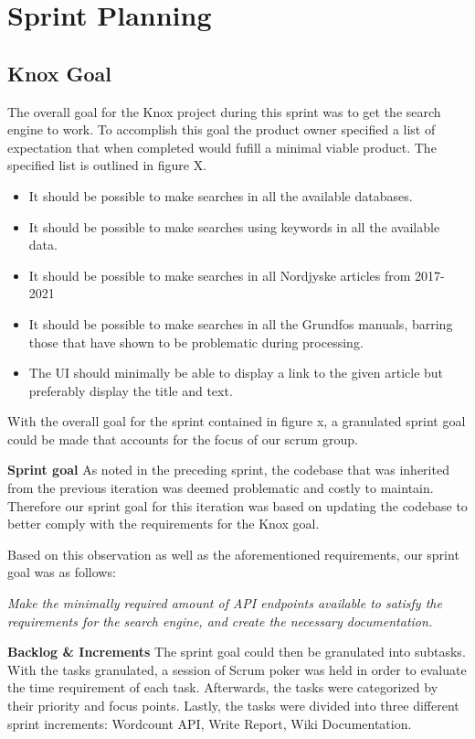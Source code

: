 \section{Sprint Planning}
\subsection{Knox Goal}
The overall goal for the Knox project during this sprint was to get the search engine to work. To accomplish this goal the product owner specified a list of expectation that when completed would fufill a minimal viable product. The specified list is outlined in figure X.
\begin{itemize}
	\item It should be possible to make searches in all the available databases.
	\item It should be possible to make searches using keywords in all the available data.
	\item It should be possible to make searches in all Nordjyske articles from 2017-2021
	\item It should be possible to make searches in all the Grundfos manuals, barring those that have shown to be problematic during processing.
	\item The UI should minimally be able to display a link to the given article but preferably display the title and text.
\end{itemize}

With the overall goal for the sprint contained in figure x, a granulated sprint goal could be made that accounts for the focus of our scrum group.


\textbf{Sprint goal}
As noted in the preceding sprint, the codebase that was inherited from the previous iteration was deemed problematic and costly to maintain. Therefore our sprint goal for this iteration was based on updating the codebase to better comply with the requirements for the Knox goal.


Based on this observation as well as the aforementioned requirements, our sprint goal was as follows:


\textit{Make the minimally required amount of API endpoints available to satisfy the requirements for the search engine, and create the necessary documentation.}


\textbf{Backlog \& Increments}
The sprint goal could then be granulated into subtasks. With the tasks granulated, a session of Scrum poker was held in order to evaluate the time requirement of each task. Afterwards, the tasks were categorized by their priority and focus points. Lastly, the tasks were divided into three different sprint increments: Wordcount API, Write Report, Wiki Documentation. 


